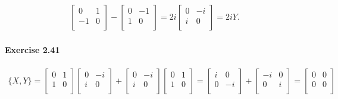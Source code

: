 \documentclass[a4paper,12pt]{article}
\newcommand{\exercise}[1]{\paragraph{Exercise #1}}
\begin{document}
\begin{gather}
\begin{bmatrix}
            0 & 1\\
            -1 & 0\\
        \end{bmatrix}
        -
        \begin{bmatrix}
            0 & -1\\
            1 & 0\\
        \end{bmatrix}
        =
        2i
        \begin{bmatrix}
            0 & -i\\
            i & 0\\
        \end{bmatrix}
        = 2i Y \textrm{.}
    \end{gather}

    \exercise{2.41}
    \begin{gather}
        \nonumber
        \{X, Y\} =
        \begin{bmatrix}
            0 & 1\\
            1 & 0\\
        \end{bmatrix}
        \begin{bmatrix}
            0 & -i\\
            i & 0\\
        \end{bmatrix}
        +
        \begin{bmatrix}
            0 & -i\\
            i & 0\\
        \end{bmatrix}
        \begin{bmatrix}
            0 & 1\\
            1 & 0\\
        \end{bmatrix}
        =
        \begin{bmatrix}
            i & 0\\
            0 & -i\\
        \end{bmatrix}
        +
        \begin{bmatrix}
            -i & 0\\
            0 & i\\
        \end{bmatrix}
        =
        \begin{bmatrix}
            0 & 0\\
            0 & 0\\

\end{bmatrix}
\end{gather}
\end{document}
